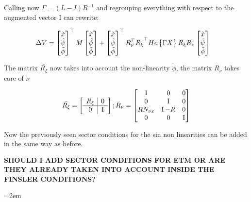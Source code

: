 \documentclass{article}
\begin{document}
Calling now $ \Gamma = (L - I) R^{-1} $ and regrouping everything with respect to the augmented vector I can rewrite:

\begin{align*}
  \Delta V &= \left[\begin{matrix}
    \tilde{x}\\
    \tilde{\psi}\\
    \tilde{\phi}
  \end{matrix}\right]^\top M \left[\begin{matrix}
    \tilde{x}\\
    \tilde{\psi}\\
    \tilde{\phi}
  \end{matrix}\right] + \left[\begin{matrix}
    \tilde{x}\\
    \tilde{\psi}\\
    \tilde{\phi}
  \end{matrix}\right]^\top R_{\nu}^\top \bar{R_{\xi}}^\top 
  He \left\{ \Gamma \bar{X}  \right\} \bar{R_{\xi}} R_{\nu} \left[\begin{matrix}
    \tilde{x}\\
    \tilde{\psi}\\
    \tilde{\phi}
  \end{matrix}\right]
\end{align*}

The matrix $\bar{R_{\xi}}$ now takes into account the non-linearity $\tilde{\phi}$, the matrix $R_{\nu}$ takes care of $\tilde{\nu}$ 

$$
  \bar{R_{\xi}} = \left[\begin{matrix}
  \begin{array}{c | c}
    R_{\xi} & 0\\
    \hline
    0 & \operatorname{I}
  \end{array}
  \end{matrix}\right]; R_{\nu} = \left[\begin{matrix}
    \operatorname{I} & 0 & 0\\
    0 & \operatorname{I} & 0\\
    R N_{\nu x} & \operatorname{I} - R & 0\\
    0 & 0 & \operatorname{I}
  \end{matrix}\right]
$$

Now the previously seen sector conditions for the sin non linearities can be added in the same way as before. 

\textbf{SHOULD I ADD SECTOR CONDITIONS FOR ETM OR ARE THEY ALREADY TAKEN INTO ACCOUNT INSIDE THE FINSLER CONDITIONS?}

\pagebreak
\emergencystretch=2em %
\printbibliography
\end{document}

